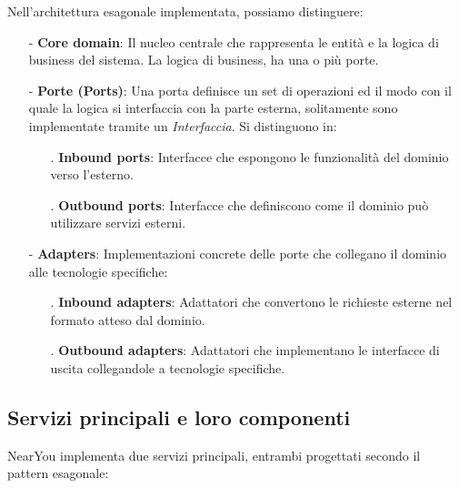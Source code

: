 \documentclass[10pt]{article}
\begin{document}
    Nell'architettura esagonale implementata, possiamo distinguere:
    \begin{itemize}
        \item[-] \textbf{Core domain}: Il nucleo centrale che rappresenta le entità e la logica di business del sistema. La logica di business, ha una o più porte. 
        \item[-] \textbf{Porte (Ports)}: Una porta definisce un set di operazioni ed il modo con il quale la logica si interfaccia con la parte esterna, solitamente sono implementate tramite un \textit{Interfaccia}. Si distinguono in:
        \begin{itemize}
            \item[.] \textbf{Inbound ports}: Interfacce che espongono le funzionalità del dominio verso l'esterno.
            \item[.] \textbf{Outbound ports}: Interfacce che definiscono come il dominio può utilizzare servizi esterni.
        \end{itemize}
        \item[-] \textbf{Adapters}: Implementazioni concrete delle porte che collegano il dominio alle tecnologie specifiche:
        \begin{itemize}
            \item[.] \textbf{Inbound adapters}: Adattatori che convertono le richieste esterne nel formato atteso dal dominio.
            \item[.] \textbf{Outbound adapters}: Adattatori che implementano le interfacce di uscita collegandole a tecnologie specifiche.
        \end{itemize}
    \end{itemize}

    \subsection{Servizi principali e loro componenti}

    NearYou implementa due servizi principali, entrambi progettati secondo il pattern esagonale:
\end{document}
